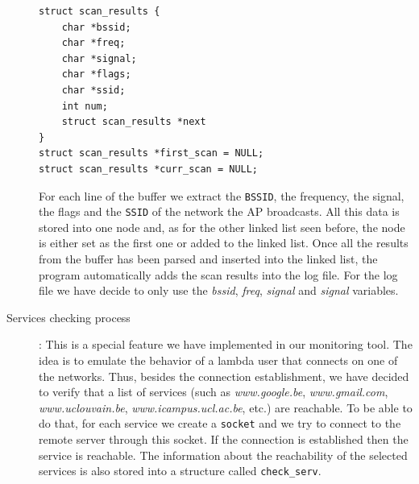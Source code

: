 \begin{description}
\begin{lstlisting}[frame=single,breaklines=true,caption={\texttt{scan\_results} structure}]
struct scan_results {
	char *bssid;
	char *freq;
	char *signal;
	char *flags;
	char *ssid;
	int num;
	struct scan_results *next
}
struct scan_results *first_scan = NULL;
struct scan_results *curr_scan = NULL;
\end{lstlisting}
	
	For each line of the buffer we extract the \texttt{BSSID}, the frequency, the signal, the flags and the \texttt{SSID} of the network the AP broadcasts. All this data is stored into one node and, as for the other linked list seen before, the node is either set as the first one or added to the linked list. Once all the results from the buffer has been parsed and inserted into the linked list, the program automatically adds the scan results into the log file. For the log file we have decide to only use the \textit{bssid}, \textit{freq}, \textit{signal} and \textit{signal} variables.

	\item[Services checking process]: This is a special feature we have implemented in our monitoring tool. The idea is to emulate the behavior of a lambda user that connects on one of the networks. Thus, besides the connection establishment, we have decided to verify that a list of services (such as \textit{www.google.be}, \textit{www.gmail.com}, \textit{www.uclouvain.be}, \textit{www.icampus.ucl.ac.be}, etc.) are reachable. To be able to do that, for each service we create a \texttt{socket} and we try to connect to the remote server through this socket. If the connection is established then the service is reachable. The information about the reachability of the selected services is also stored into a structure called \texttt{check\_serv}. 



\end{description}
